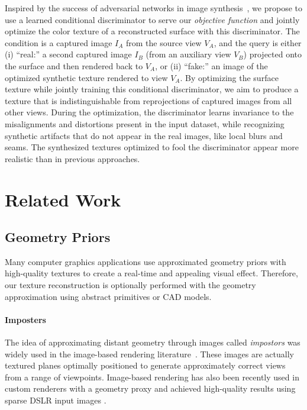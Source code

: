 Inspired by the success of adversarial networks in image synthesis~\cite{goodfellow2014generative}, we propose to use a learned conditional discriminator to serve our {\em objective function} and jointly optimize the color texture of a reconstructed surface with this discriminator.
The condition is a captured image $I_A$ from the source view $V_A$, and the query is either (i) ``real:'' a second captured image $I_B$ (from an auxiliary view $V_B$) projected onto the surface and then rendered back to $V_A$, or (ii) ``fake:'' an image of the optimized synthetic texture rendered to view $V_A$. By optimizing the surface texture while jointly training this conditional discriminator, we aim to produce a texture that is indistinguishable from reprojections of captured images from all other views.  
%
During the optimization, the discriminator learns invariance to the misalignments and distortions present in the input dataset, while recognizing synthetic artifacts that do not appear in the real images, like local blurs and seams.  The synthesized textures optimized to fool the discriminator appear more realistic than in previous approaches.

\section{Related Work}
\label{related:texture-recon}

\subsection{Geometry Priors}
Many computer graphics applications use approximated geometry priors with high-quality textures to create a real-time and appealing visual effect. Therefore, our texture reconstruction is optionally performed with the geometry approximation using abstract primitives or CAD models.

\paragraph*{Imposters} The idea of approximating distant geometry through images called {\em impostors} was widely used in the image-based rendering literature~\cite{sillion1997efficient,decoret1999multi}. 
These images are actually textured planes optimally positioned to generate approximately correct views from a range of viewpoints.
Image-based rendering has also been recently used in custom renderers with a geometry proxy and achieved high-quality results using sparse DSLR input images \cite{hedman2016scalable}.

